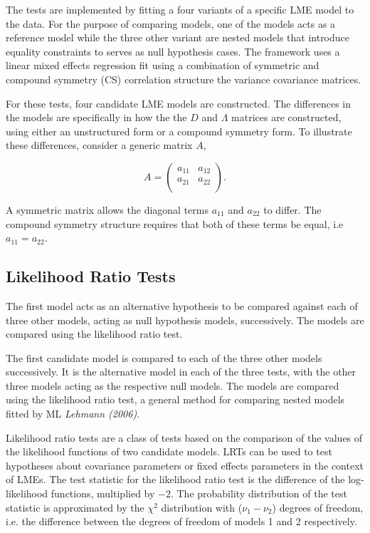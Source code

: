 \documentclass[12pt, a4paper]{report}
\theoremstyle{plain}
\theoremstyle{definition}
\theoremstyle{remark}
\begin{document}
	The tests are implemented by fitting a four variants of a specific LME model to the data. For the purpose of comparing models, one of the models acts as a reference model while the three other variant are nested models that introduce equality constraints to serves as null hypothesis cases. The framework uses a linear mixed effects regression fit using a combination of symmetric and compound symmetry (CS) correlation structure the variance covariance matrices.
	

	
	For these tests, four candidate LME models are constructed. The differences in the models are specifically in how the the $D$ and $\Lambda$ matrices are constructed, using either an unstructured form or a compound symmetry form. To illustrate these differences, consider a generic matrix $A$,
	
	\[
	{A} = \left( \begin{array}{cc}
	a_{11} & a_{12}  \\
	a_{21} & a_{22}  \\
	\end{array}\right).
	\]
	
	A symmetric matrix allows the diagonal terms $a_{11}$ and $a_{22}$ to differ. The compound symmetry structure requires that both of these terms be equal, i.e $a_{11} = a_{22}$.

	\subsection{Likelihood Ratio Tests}
	The first model acts as an alternative hypothesis to be compared against each of three other models, acting as null hypothesis models, successively. The models are compared using the likelihood ratio test.
	
	The first candidate model is compared to each of the three other models successively. It is the alternative model in each of the three tests, with the other three models acting as the respective null models. The models are compared using the likelihood ratio test, a general method for comparing nested models fitted by ML \citep{Lehmann2006} \textit{Lehmann (2006)}.
	
	Likelihood ratio tests are a class of tests based on the comparison of the values of the likelihood functions of two candidate models. LRTs can be used to test hypotheses about covariance parameters or fixed effects parameters in the context of LMEs. The test statistic for the likelihood ratio test is the difference of the log-likelihood functions, multiplied by $-2$.
	The probability distribution of the test statistic is approximated by the $\chi^2$ distribution with ($\nu_{1} - \nu_{2}$) degrees of freedom, i.e. the difference between the degrees of freedom of models 1 and 2 respectively.
	
\end{document}
